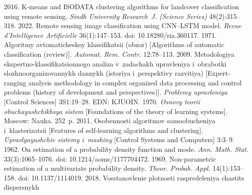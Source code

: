 \vspace*{-8pt}

  \begin{multicols}{2}

\renewcommand{\bibname}{\protect\rmfamily References}

{\small\frenchspacing
 {%
 \begin{thebibliography}{99} 
 
 \vspace*{-2pt}
 
 
 2016.  
K-means and ISODATA clustering algorithms for landcover classification using remote sensing. 
\textit{Sindh University Research~J. (Science Series)} 48(2):315--318.
 2022. Remote sensing image 
classification using CNN--LSTM model. \textit{Revue d'Intelligence Artificielle} 36(1):147--153. 
doi: 10.18280/ria.360117.
 1971. Algoritmy avtomaticheskoy klassifikatsii (obzor)
[Algorithms of automatic classification (review)]. \textit{Automat. 
Rem. Contr.} 12:78--113.
 2009. Metodologiya ekspertno-klassifikatsionnogo analiza v~zadachakh 
upravleniya i~obrabotki slozhnoorganizovannykh dannykh (istoriya i~perspektivy razvitiya) 
[Expert-ranging analysis methodology in complex organized data processing and control problems 
(history of development and perspectives)]. \textit{Problemy upravleniya} [Control Sciences] 
3S1:19--28. EDN: KJUOIN.
 1970. \textit{Osnovy teorii obuchayushchikhsya sistem} [Foundations of the 
theory of learning systems]. Moscow: Nauka. 252~p.
 2011. Osobennosti algoritmov samoobucheniya 
i~klasterizatsii [Features of self-learning algorithms and clustering]. \textit{Upravlyayushchie 
sistemy i~mashiny} [Control Systems and Computers] 3:3--9.
 1962. On estimation of a probability density function and mode. \textit{Ann. 
Math. Stat.} 33(3):1065--1076. doi: 10.1214/aoms/1177704472.
 1969. Non-parametric estimation of a multivariate probability density. 
\textit{Theor. Probab. Appl.} 14(1):153--158. doi: 10.1137/1114019.
 2018. Vosstanovlenie plotnosti raspredeleniya chastits dispersnykh 

\end{thebibliography}}}
\end{multicols}
